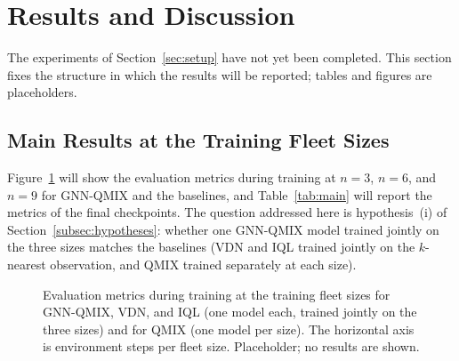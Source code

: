 \section{Results and Discussion}
\label{sec:results}
The experiments of Section~\ref{sec:setup} have not yet been completed. This section fixes
the structure in which the results will be reported; tables and figures are placeholders.

\subsection{Main Results at the Training Fleet Sizes}
\label{subsec:results-main}
Figure~\ref{fig:learning-curves} will show the evaluation metrics during training at
$n=3$, $n=6$, and $n=9$ for GNN-QMIX and the baselines, and Table~\ref{tab:main} will report
the metrics of the final checkpoints. The question addressed here is hypothesis~(i) of
Section~\ref{subsec:hypotheses}: whether one GNN-QMIX model trained jointly on the three
sizes matches the baselines (VDN and IQL trained jointly on the $k$-nearest observation, and
QMIX trained separately at each size).

\begin{figure}[hbt!]
\centering
{}
\caption{\label{fig:learning-curves} Evaluation metrics during training at the training
fleet sizes for GNN-QMIX, VDN, and IQL (one model each, trained jointly on the three sizes) and for
QMIX (one model per size). The horizontal axis is environment steps per fleet size. Placeholder; no results are shown.}
\end{figure}

